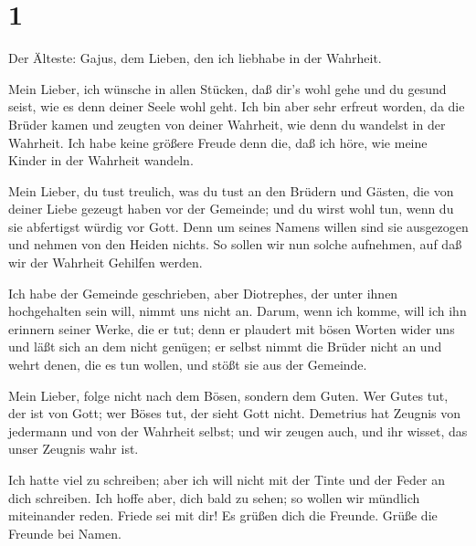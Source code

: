 \hypertarget{section}{%
\section{1}\label{section}}

 Der Älteste: Gajus, dem Lieben, den ich liebhabe in der
Wahrheit.

 Mein Lieber, ich wünsche in allen Stücken, daß dir's wohl
gehe und du gesund seist, wie es denn deiner Seele wohl geht.
 Ich bin aber sehr erfreut worden, da die Brüder kamen und
zeugten von deiner Wahrheit, wie denn du wandelst in der Wahrheit.
 Ich habe keine größere Freude denn die, daß ich höre, wie
meine Kinder in der Wahrheit wandeln.

 Mein Lieber, du tust treulich, was du tust an den Brüdern
und Gästen,  die von deiner Liebe gezeugt haben vor der
Gemeinde; und du wirst wohl tun, wenn du sie abfertigst würdig vor Gott.
 Denn um seines Namens willen sind sie ausgezogen und nehmen
von den Heiden nichts.  So sollen wir nun solche aufnehmen,
auf daß wir der Wahrheit Gehilfen werden.

 Ich habe der Gemeinde geschrieben, aber Diotrephes, der
unter ihnen hochgehalten sein will, nimmt uns nicht an. 
Darum, wenn ich komme, will ich ihn erinnern seiner Werke, die er tut;
denn er plaudert mit bösen Worten wider uns und läßt sich an dem nicht
genügen; er selbst nimmt die Brüder nicht an und wehrt denen, die es tun
wollen, und stößt sie aus der Gemeinde.

 Mein Lieber, folge nicht nach dem Bösen, sondern dem
Guten. Wer Gutes tut, der ist von Gott; wer Böses tut, der sieht Gott
nicht.  Demetrius hat Zeugnis von jedermann und von der
Wahrheit selbst; und wir zeugen auch, und ihr wisset, das unser Zeugnis
wahr ist.

 Ich hatte viel zu schreiben; aber ich will nicht mit der
Tinte und der Feder an dich schreiben.  Ich hoffe aber,
dich bald zu sehen; so wollen wir mündlich miteinander reden. Friede sei
mit dir! Es grüßen dich die Freunde. Grüße die Freunde bei Namen.
